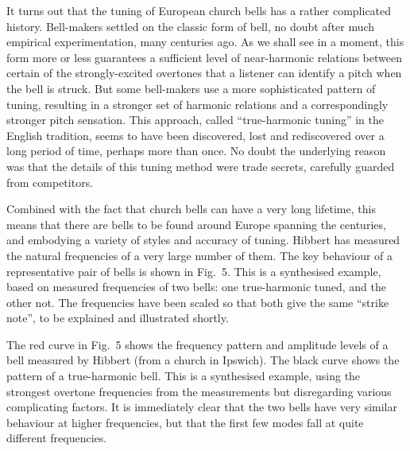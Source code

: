   It turns out that the tuning of European church bells has a rather 
  complicated history. Bell-makers settled on the classic form of bell, no 
  doubt after much empirical experimentation, many centuries ago. As we shall 
  see in a moment, this form more or less guarantees a sufficient level of 
  near-harmonic relations between certain of the strongly-excited overtones 
  that a listener can identify a pitch when the bell is struck. But some 
  bell-makers use a more sophisticated pattern of tuning, resulting in a 
  stronger set of harmonic relations and a correspondingly stronger pitch 
  sensation. This approach, called ``true-harmonic tuning'' in the English 
  tradition, seems to have been discovered, lost and rediscovered over a long 
  period of time, perhaps more than once. No doubt the underlying reason was 
  that the details of this tuning method were trade secrets, carefully guarded 
  from competitors. 

  Combined with the fact that church bells can have a very long lifetime, this 
  means that there are bells to be found around Europe spanning the centuries, 
  and embodying a variety of styles and accuracy of tuning. Hibbert has 
  measured the natural frequencies of a very large number of them. The key 
  behaviour of a representative pair of bells is shown in Fig.\ 5. This is a 
  synthesised example, based on measured frequencies of two bells: one 
  true-harmonic tuned, and the other not. The frequencies have been scaled so 
  that both give the same ``strike note'', to be explained and illustrated 
  shortly. 


  The red curve in Fig.\ 5 shows the frequency pattern and amplitude levels of 
  a bell measured by Hibbert (from a church in Ipswich). The black curve shows 
  the pattern of a true-harmonic bell. This is a synthesised example, using the 
  strongest overtone frequencies from the measurements but disregarding various 
  complicating factors. It is immediately clear that the two bells have very 
  similar behaviour at higher frequencies, but that the first few modes fall at 
  quite different frequencies. 

